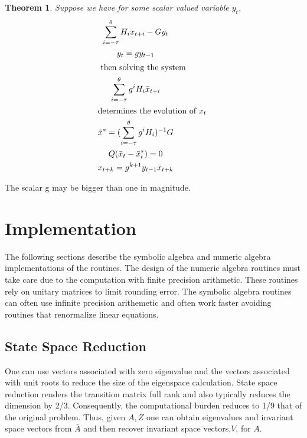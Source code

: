 \documentclass{article}
\newtheorem{thrm}{Theorem}
\begin{document}
{\begin{thrm}
Suppose we have for some scalar valued variable $y_t$,
\begin{gather*}
\sum_{i=-\tau}^\theta H_i x_{t+i} - G y_t\\
y_t= g y_{t-1} \\ \intertext{ then  solving the system }
\sum_{i=-\tau}^\theta g^i H_i \bar{x}_{t+i} \\ \intertext{determines the evolution
of $x_t$ }
\bar{x}^\ast = (\sum_{i=-\tau}^\theta g^i H_i)^{-1} G\\
Q (\bar{x}_t - \bar{x}_t^\ast) = 0\\
x_{t+k} = g^{k+1} y_{t-1} \bar{x}_{t+k}
\end{gather*}
\end{thrm}

The scalar g may be bigger than one in magnitude.


\section{Implementation}
The following sections describe the symbolic algebra and numeric algebra
implementations of the routines. The design of the numeric algebra routines 
must take care due to the computation with finite precision arithmetic.
These routines rely on unitary matrices to limit rounding error.
The symbolic algebra routines can often use infinite precision arithemetic
and often work faster avoiding routines that renormalize linear equations.


\subsection{State Space Reduction}



\label{sec:inessential}

One can use vectors associated with zero eigenvalue and 
the vectors associated with unit roots to reduce the size of the
eigenspace calculation.
State space reduction renders the transition matrix full rank
and  also typically reduces
the dimension by 2/3. Consequently, the computational 
burden reduces to 1/9 that of the original problem.
Thus, given $A,Z$ one can obtain eigenvalues and invariant space vectors from
$\bar{A}$ and then recover invariant space vectors,$V$, for $A$.

}
\end{document}
